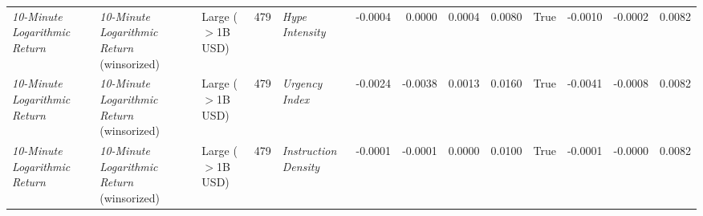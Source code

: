 \begin{tabular}{lllrlrrrrrrrr}
\textit{10-Minute Logarithmic Return} & \textit{10-Minute Logarithmic Return} (winsorized) & Large ($>$1B USD) & 479 & \textit{Hype Intensity} & -0.0004 & 0.0000 & 0.0004 & 0.0080 & True & -0.0010 & -0.0002 & 0.0082 \\
\textit{10-Minute Logarithmic Return} & \textit{10-Minute Logarithmic Return} (winsorized) & Large ($>$1B USD) & 479 & \textit{Urgency Index} & -0.0024 & -0.0038 & 0.0013 & 0.0160 & True & -0.0041 & -0.0008 & 0.0082 \\
\textit{10-Minute Logarithmic Return} & \textit{10-Minute Logarithmic Return} (winsorized) & Large ($>$1B USD) & 479 & \textit{Instruction Density} & -0.0001 & -0.0001 & 0.0000 & 0.0100 & True & -0.0001 & -0.0000 & 0.0082 \\
\bottomrule
\end{tabular}
